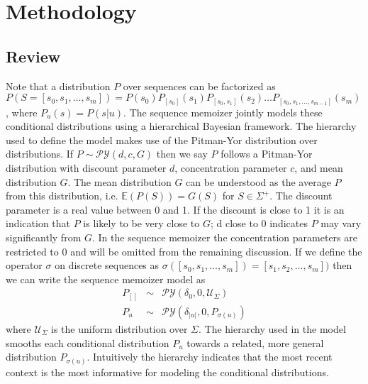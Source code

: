 \section{Methodology}
\label{section:methodology}
\newcommand{\PY}{\ensuremath{\mathcal{P}\mathcal{Y}}}

\subsection{Review}

Note that a distribution $P$ over sequences can be factorized as $P(S = [s_0, s_1, \ldots, s_m]) = P(s_0)P_{[s_0]}(s_1)P_{[s_0,s_1]}(s_2) \ldots P_{[s_0,s_1,\ldots,s_{m-1}]}(s_m)$, where $P_u(s) = P(s | u)$.  The sequence memoizer jointly models these conditional distributions using a hierarchical Bayesian framework.  The hierarchy used to define the model makes use of the Pitman-Yor \citep{Pitman1997} distribution over distributions. If $P \sim \PY(d,c,G)$ then we say $P$ follows a Pitman-Yor distribution with discount parameter $d$, concentration parameter $c$, and mean distribution $G$.  The mean distribution $G$ can be understood as the average $P$ from this distribution, i.e. $\mathbb{E}(P(S)) = G(S)$ for $S \in \Sigma^{+}$.  The discount parameter is a real value between 0 and 1.  If the discount is close to 1 it is an indication that $P$ is likely to be very close to $G$; d close to 0 indicates $P$ may vary significantly from $G$.  In the sequence memoizer the concentration parameters are restricted to 0 and will be omitted from the remaining discussion. If we define the operator $\sigma$ on discrete sequences as $\sigma([s_0, s_1, \ldots, s_m]) = [s_1,s_2, \ldots, s_m])$ then we can write the sequence memoizer model as 
%
\begin{eqnarray*}
	P_{[ ]} &\sim& \PY(\delta_0,0,\mathcal{U}_{\Sigma})\\
	P_{u} &\sim& \PY(\delta_{|u|}, 0, P_{\sigma(u)})
\end{eqnarray*}
\noindent where $\mathcal{U}_{\Sigma}$ is the uniform distribution over $\Sigma$.  The hierarchy used in the model smooths each conditional distribution $P_u$ towards a related, more general distribution $P_{\sigma(u)}$.  Intuitively the hierarchy indicates that the most recent context is the most informative for modeling the conditional distributions.

